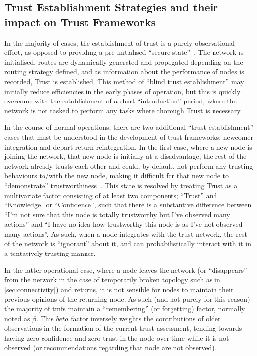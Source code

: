 \subsection{Trust Establishment Strategies and their impact on Trust Frameworks}\label{sec:trust_establishment}

In the majority of cases, the establishment of trust is a purely observational effort, as opposed to providing a pre-initialised ``secure state''~\cite{Liu2006, Li2007, Theodorakopoulos2004}.
The network is initialised, routes are dynamically generated and propogated depending on the routing strategy defined, and as information about the performance of nodes is recorded, Trust is established. 
This method of ``blind trust establishment'' may initially reduce efficiencies in the early phases of operation, but this is quickly overcome with the establishment of a short ``introduction'' period, where the network is not tasked to perform any tasks where thorough Trust is necessary.

In the course of normal operations, there are two additional ``trust establishment'' cases that must be understood in the development of trust frameworks; newcomer integration and depart-return reintegration. 
In the first case, where a new node is joining the network, that new node is initially at a disadvantage; the rest of the network already trusts each other and could, by default, not perform any trusting behaviours to/with the new node, making it difficult for that new node to ``demonstrate'' trustworthiness~\cite{Li2007}.
This state is resolved by treating Trust as a multivariate factor consisting of at least two components; ``Trust'' and ``Knowledge'' or ``Confidence'', such that there is a substantive difference between ``I'm not sure that this node is totally trustworthy but I've observed many actions'' and ``I have no idea how trustworthy this node is as I've not observed many actions''.
As such, when a node integrates with the trust network, the rest of the network is ``ignorant'' about it, and can probabilistically interact with it in a tentatively trusting manner.

In the latter operational case, where a node leaves the network (or ``disappears'' from the network in the case of temporarily broken topology such as in \autoref{sec:connectivity}) and returns, it is not sensible for nodes to maintain their previous opinions of the returning node. 
As such (and not purely for this reason) the majority of \glspl{tmf} maintain a ``remembering'' (or forgetting) factor, normally noted as $\beta$.
This $beta$ factor inversely weights the contributions of older observations in the formation of the current trust assessment, tending towards having zero confidence and zero trust in the node over time while it is not observed (or recommendations regarding that node are not observed).

